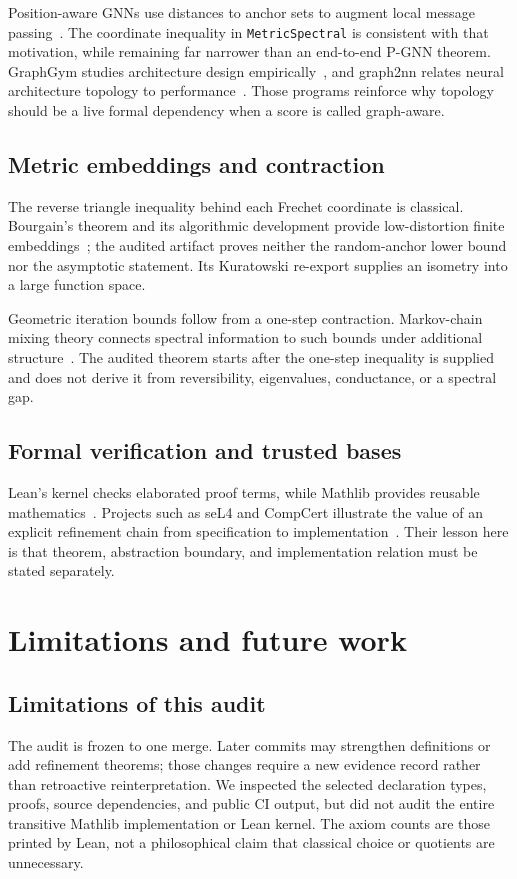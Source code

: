 \documentclass[10pt,letterpaper]{article}
\theoremstyle{definition}
\begin{document}
Position-aware GNNs use distances to anchor sets to augment local message
passing~\cite{you2019pgnn}. The coordinate inequality in
\texttt{MetricSpectral} is consistent with that motivation, while remaining
far narrower than an end-to-end P-GNN theorem. GraphGym studies architecture
design empirically~\cite{you2020graphgym}, and graph2nn relates neural
architecture topology to performance~\cite{you2020graph2nn}. Those programs
reinforce why topology should be a live formal dependency when a score is
called graph-aware.

\subsection{Metric embeddings and contraction}
The reverse triangle inequality behind each Frechet coordinate is classical.
Bourgain's theorem and its algorithmic development provide low-distortion
finite embeddings~\cite{bourgain1985,llr1995}; the audited artifact proves
neither the random-anchor lower bound nor the asymptotic statement. Its
Kuratowski re-export supplies an isometry into a large function space.

Geometric iteration bounds follow from a one-step contraction. Markov-chain
mixing theory connects spectral information to such bounds under additional
structure~\cite{levinperes2017,diaconisstroock1991}. The audited theorem starts
after the one-step inequality is supplied and does not derive it from
reversibility, eigenvalues, conductance, or a spectral gap.

\subsection{Formal verification and trusted bases}
Lean's kernel checks elaborated proof terms, while Mathlib provides reusable
mathematics~\cite{lean4,mathlib}. Projects such as seL4 and CompCert illustrate
the value of an explicit refinement chain from specification to
implementation~\cite{sel4,compcert}. Their lesson here is that theorem,
abstraction boundary, and implementation relation must be stated separately.

\section{Limitations and future work}\label{sec:limits}
\subsection{Limitations of this audit}
The audit is frozen to one merge. Later commits may strengthen definitions or
add refinement theorems; those changes require a new evidence record rather
than retroactive reinterpretation. We inspected the selected declaration
types, proofs, source dependencies, and public CI output, but did not audit the
entire transitive Mathlib implementation or Lean kernel. The axiom counts are
those printed by Lean, not a philosophical claim that classical choice or
quotients are unnecessary.
\end{document}

